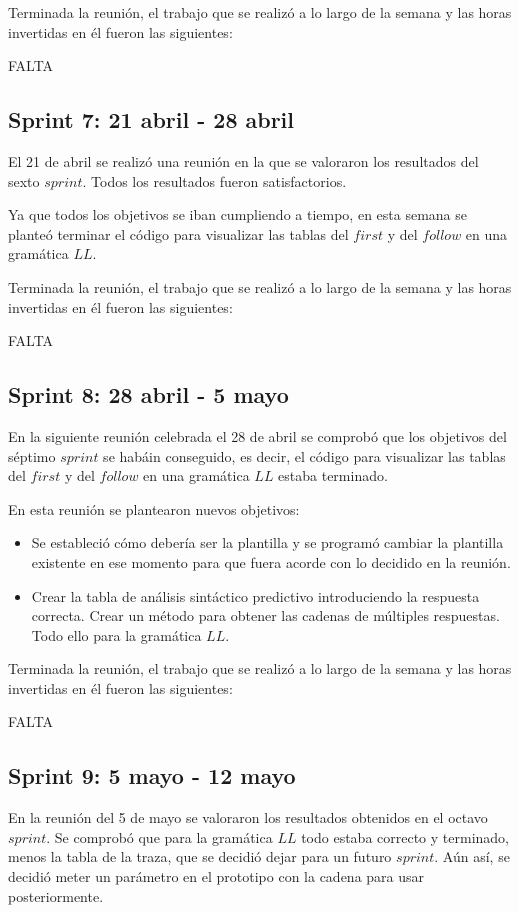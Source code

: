Terminada la reunión, el trabajo que se realizó a lo largo de la semana y las horas invertidas en él fueron las siguientes:

FALTA

\subsection{Sprint 7: 21 abril - 28 abril}
El 21 de abril se realizó una reunión en la que se valoraron los resultados del sexto $sprint$. Todos los resultados fueron satisfactorios.

Ya que todos los objetivos se iban cumpliendo a tiempo, en esta semana se planteó terminar el código para visualizar las tablas del $first$ y del $follow$ en una gramática $LL$.

Terminada la reunión, el trabajo que se realizó a lo largo de la semana y las horas invertidas en él fueron las siguientes:

FALTA
\subsection{Sprint 8: 28 abril - 5 mayo}
En la siguiente reunión celebrada el 28 de abril se comprobó que los objetivos del séptimo $sprint$ se habáin conseguido, es decir, el código para visualizar las tablas del $first$ y del $follow$ en una gramática $LL$ estaba terminado.

En esta reunión se plantearon nuevos objetivos:
\begin{itemize}
\item Se estableció cómo debería ser la plantilla y se programó cambiar la plantilla existente en ese momento para que fuera acorde con lo decidido en la reunión.
\item Crear la tabla de análisis sintáctico predictivo introduciendo la respuesta correcta. Crear un método para obtener las cadenas de múltiples respuestas. Todo ello para la gramática $LL$. 
\end{itemize}

Terminada la reunión, el trabajo que se realizó a lo largo de la semana y las horas invertidas en él fueron las siguientes:

FALTA

\subsection{Sprint 9: 5 mayo - 12 mayo}
En la reunión del 5 de mayo se valoraron los resultados obtenidos en el octavo $sprint$. Se comprobó que para la gramática $LL$ todo estaba correcto y terminado, menos la tabla de la traza, que se decidió dejar para un futuro $sprint$. Aún así, se decidió meter un parámetro en el prototipo con la cadena para usar posteriormente.

